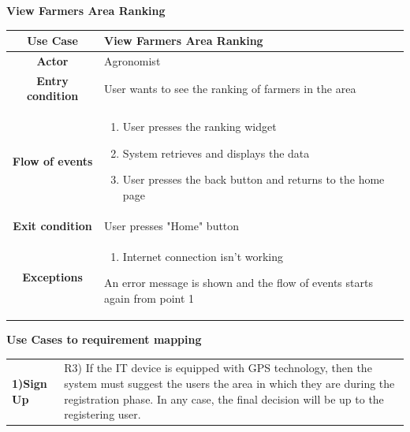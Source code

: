 \documentclass[table, 12pt]{article}
\begin{document}
\begin{itemize}
            \begin{table}[H]
                \item[] \textbf{View Farmers Area Ranking}
                \item[] 
                \centering
                \begin{tabular}{|c |m{}|}
                    \hline
                    \textbf{Use Case} & View Farmers Area Ranking\\ \hline
                    \textbf{Actor} & Agronomist\\ \hline
                    \textbf{Entry condition} & User wants to see the ranking of farmers in the area\\  \hline
                    \textbf{Flow of events} & \begin{enumerate}
                                                \item User presses the ranking widget 
                                                \item System retrieves and displays the data
                                                \item User presses the back button and returns to the home page
                                            \end{enumerate}\\ \hline
                    \textbf{Exit condition} & User presses "Home" button\\ \hline
                    \textbf{Exceptions} & \begin{enumerate}
                        \item Internet connection isn't working
                    \end{enumerate}
                    An error message is shown and the flow of events starts again from point 1\\ \hline                    
                \end{tabular}
            \end{table}
            
        
        \newpage

        \item \textbf{Use Cases to requirement mapping}
        
        \item[] \begin{longtable}{|p{}|p{}|}
                    \hline
                    \cellcolor{SpringGreen!50}\textbf{1)Sign Up}\centering & R3) If the IT device is equipped with GPS technology, then the system must suggest the users the area in which they are during the registration phase. In any case, the final decision will be up to the registering user.
                                                                     

\end{longtable}
\end{itemize}
\end{document}

